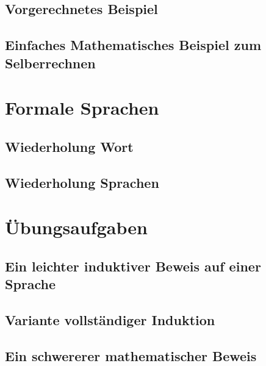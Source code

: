 \subsection{Vorgerechnetes Beispiel}
\subsection{Einfaches Mathematisches Beispiel zum Selberrechnen}

\section{Formale Sprachen}
\subsection{Wiederholung Wort} %
\subsection{Wiederholung Sprachen} %

\section{Übungsaufgaben}
\subsection{Ein leichter induktiver Beweis auf einer Sprache}
\subsection{Variante vollständiger Induktion} %
\subsection{Ein schwererer mathematischer Beweis}

